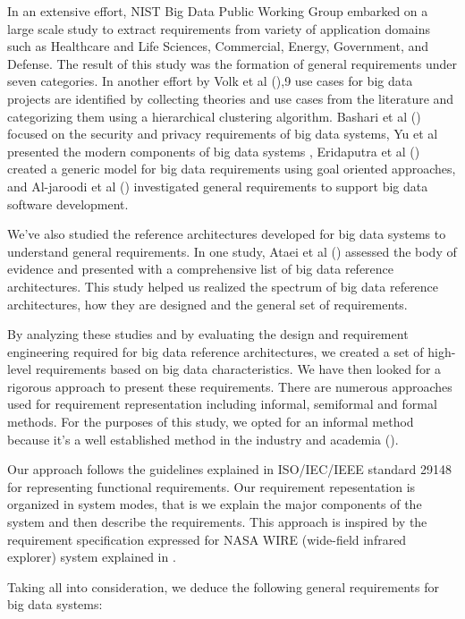 \documentclass[conference]{IEEEtran}
\begin{document}
In an extensive effort, NIST Big Data Public Working Group embarked on a large scale study to extract requirements from variety of application domains such as Healthcare and Life Sciences, Commercial, Energy, Government, and Defense. The result of this study was the formation of general requirements under seven categories. In another effort by Volk et al (\cite{volk2020identifying}),9 use cases for big data projects are identified by collecting theories and use cases from the literature and categorizing them using a hierarchical clustering algorithm. Bashari et al (\cite{bashari2016security}) focused on the security and privacy requirements of big data systems, Yu et al presented the modern components of big data systems \cite{yu2019components}, Eridaputra et al (\cite{eridaputra2014modeling}) created a generic model for big data requirements using goal oriented approaches, and Al-jaroodi et al (\cite{al2016characteristics}) investigated general requirements to support big data software development. 

We've also studied the reference architectures developed for big data systems to understand general requirements. In one study, Ataei et al (\cite{ataei2020big}) assessed the body of evidence and presented with a comprehensive list of big data reference architectures. This study helped us realized the spectrum of big data reference architectures, how they are designed and the general set of requirements.  

By analyzing these studies and by evaluating the design and requirement engineering required for big data reference architectures, we created a set of high-level requirements based on big data characteristics. We have then looked for a rigorous approach to present these requirements. There are numerous approaches used for requirement representation including informal, semiformal and formal methods. For the purposes of this study, we opted for an informal method because it's a well established method in the industry and academia (\cite{kassab2014state}). 

Our approach follows the guidelines explained in ISO/IEC/IEEE standard 29148 for representing functional requirements. Our requirement repesentation is organized in system modes, that is we explain the major components of the system and then describe the requirements. This approach is inspired by the requirement specification expressed for NASA WIRE (wide-field infrared explorer) system explained in \cite{laplante2017requirements}.

Taking all into consideration, we deduce the following general requirements for big data systems: 






\end{document}
